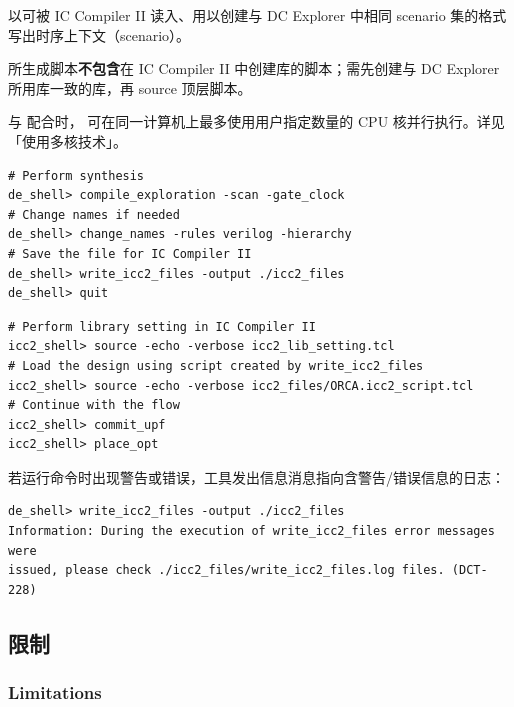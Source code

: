  以可被 IC Compiler II 读入、用以创建与 DC Explorer 中相同 scenario 集的格式写出时序上下文（scenario）。

所生成脚本\textbf{不包含}在 IC Compiler II 中创建库的脚本；需先创建与 DC Explorer 所用库一致的库，再 source 顶层脚本。

与  配合时， 可在同一计算机上最多使用用户指定数量的 CPU 核并行执行。详见「使用多核技术」。

\begin{lstlisting}[caption={从 DC Explorer 以 IC Compiler II 格式写出设计信息}]
# Perform synthesis
de_shell> compile_exploration -scan -gate_clock
# Change names if needed
de_shell> change_names -rules verilog -hierarchy
# Save the file for IC Compiler II
de_shell> write_icc2_files -output ./icc2_files
de_shell> quit
\end{lstlisting}

\begin{lstlisting}[caption={将设计读入 IC Compiler II}]
# Perform library setting in IC Compiler II
icc2_shell> source -echo -verbose icc2_lib_setting.tcl
# Load the design using script created by write_icc2_files
icc2_shell> source -echo -verbose icc2_files/ORCA.icc2_script.tcl
# Continue with the flow
icc2_shell> commit_upf
icc2_shell> place_opt
\end{lstlisting}

若运行命令时出现警告或错误，工具发出信息消息指向含警告/错误信息的日志：
\begin{lstlisting}
de_shell> write_icc2_files -output ./icc2_files
Information: During the execution of write_icc2_files error messages were
issued, please check ./icc2_files/write_icc2_files.log files. (DCT-228)
\end{lstlisting}

\subsection{限制}
\subsubsection*{Limitations}

